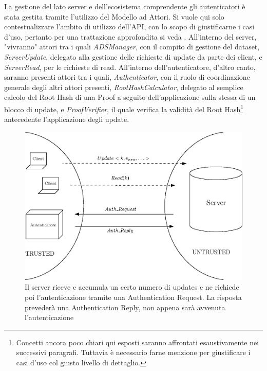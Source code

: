 	La gestione del lato server e dell'ecosistema comprendente gli autenticatori è stata gestita tramite l'utilizzo del Modello ad Attori. Si vuole qui solo contestualizzare l'ambito di utilizzo dell'API, con lo scopo di giustificarne i casi d'uso, pertanto per una trattazione approfondita si veda \cite{pipelineintegrity_thesis}. All'interno del server, "vivranno" attori tra i quali \textit{ADSManager}, con il compito di gestione del dataset, \textit{ServerUpdate}, delegato alla gestione delle richieste di update da parte dei client, e \textit{ServerRead}, per le richieste di read. All'interno dell'autenticatore, d'altro canto, saranno presenti attori tra i quali, \textit{Authenticator}, con il ruolo di coordinazione generale degli altri attori presenti, \textit{RootHashCalculator}, delegato al semplice calcolo del Root Hash di una Proof a seguito dell'applicazione sulla stessa di un blocco di update, e \textit{ProofVerifier}, il quale verifica la validità del Root Hash\footnote{Concetti ancora poco chiari qui esposti saranno affrontati esaustivamente nei successivi paragrafi. Tuttavia è necessario farne menzione per giustificare i casi d'uso col giusto livello di dettaglio.} antecedente l'applicazione degli update. \\
	
	\begin{figure}
		\centering
		\includegraphics[scale=0.6]{figure/semicircles.eps}
		\caption{Il server riceve e accumula un certo numero di updates e ne richiede poi l'autenticazione tramite una Authentication Request. La risposta prevederà una Authentication Reply, non appena sarà avvenuta l'autenticazione}\label{fig:semicircles}
	\end{figure}

